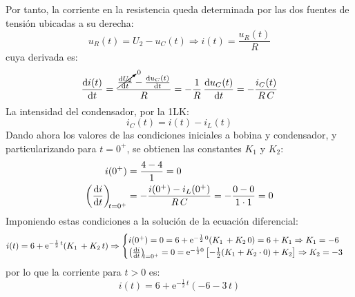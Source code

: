 \begin{example}
  Por tanto, la corriente en la resistencia queda determinada por las
  dos fuentes de tensión ubicadas a su derecha:
  \begin{equation*}
    u_R(t)=U_2-u_C(t)\Rightarrow i(t)=\dfrac{u_R(t)}{R}
  \end{equation*}
  cuya derivada es:
  \begin{equation*}
    \diff{i(t)}{t}=\dfrac{\cancelto{0}{\diff{U_2}{t}}-\diff{u_C(t)}{t}}{R}=-\dfrac{1}{R}\,\diff{u_C(t)}{t}=-\dfrac{i_C(t)}{R\,C}
  \end{equation*}
  La intensidad del condensador, por la 1LK:
  \begin{equation*}
    i_C(t)=i(t)-i_L(t)
  \end{equation*}
  Dando ahora los valores de las condiciones iniciales a bobina y
  condensador, y particularizando para $t=0^+$, se obtienen las
  constantes $K_1$ y $K_2$:
  \begin{align*}
    i(0^+)&=\dfrac{4-4}{1}=0\\
    \diff{i}{t}[t = 0^+]&=-\dfrac{i(0^+)-i_L(0^+)}{R\,C}=-\dfrac{0-0}{1\cdot 1}=0
  \end{align*}
  Imponiendo estas condiciones a la solución de la ecuación
  diferencial:
  \begin{equation*}
    i(t)=6+\mathrm{e}^{-\frac{1}{2}\,t}(K_1\,+K_2\,t)\Rightarrow
    \begin{cases}
      i(0^+)=0=6+\mathrm{e}^{-\frac{1}{2}\,0}(K_1\,+K_2\,0)=6+K_1\Rightarrow K_1=-6\\
      \diff{i}{t}[t = 0^+]=0=\mathrm{e}^{-\frac{1}{2}0}\left[-\frac{1}{2}(K_1+K_2\cdot 0)+K_2 \right]\Rightarrow K_2=-3
    \end{cases}
  \end{equation*}
  por lo que la corriente para $t>0$ es:
  \begin{equation*}
    i(t)=6+\mathrm{e}^{-\frac{1}{2}\,t}(-6-3\,t)
  \end{equation*}
	    
\end{example}
	

